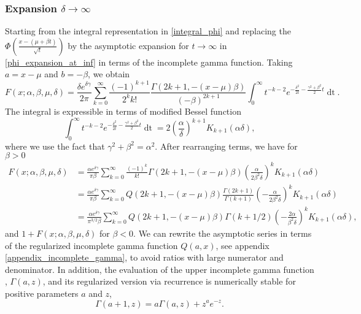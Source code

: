 \documentclass[10pt,a4paper,oneside]{article}
\numberwithin{equation}{section}
\begin{document}
\subsubsection{Expansion $\delta \to \infty$}
Starting from the integral representation in \eqref{integral_phi} and replacing the $\Phi\left(\frac{x-(\mu + \beta t)}{\sqrt{t}}\right)$ by the asymptotic expansion for $t\to \infty$ in \eqref{phi_expansion_at_inf} in terms of the incomplete gamma function. Taking $a = x -\mu$ and $b = -\beta$, we obtain
\begin{equation}
F(x; \alpha, \beta, \mu, \delta) = \frac{\delta e^{\delta \gamma}}{2\pi} \sum_{k=0}^{\infty}\frac{(-1)^{k+1}}{2^k k!} \frac{\Gamma(2k+1, -(x-\mu)\beta)}{(-\beta)^{2k+1}} \int_0^{\infty} t^{-k-2} e^{-\frac{\delta^2}{2t} - \frac{\gamma^2 + \beta^2}{2}t} \mathop{dt}.
\end{equation}
The integral is expressible in terms of modified Bessel function
\begin{equation}
\int_0^{\infty} t^{-k-2} e^{-\frac{\delta^2}{2t} - \frac{\gamma^2 + \beta^2}{2}t} \mathop{dt} = 2 \left(\frac{\alpha}{\delta}\right)^{k + 1} K_{k+1}(\alpha \delta),
\end{equation}
where we use the fact that $\gamma^2+ \beta^2 = \alpha^2$. After rearranging terms, we have for $\beta > 0$
\begin{align}\label{general_asymptotic_delta}
F(x; \alpha, \beta, \mu, \delta) &= \frac{\alpha e^{\delta \gamma}}{\pi \beta}\sum_{k=0}^{\infty} \frac{(-1)^k}{k!} \Gamma(2k + 1, -(x-\mu)\beta)\left(\frac{\alpha}{2\beta^2 \delta}\right)^k K_{k+1}(\alpha \delta)\\
 &=\frac{\alpha e^{\delta \gamma}}{\pi \beta}\sum_{k=0}^{\infty} Q(2k + 1, -(x-\mu)\beta)\frac{\Gamma(2k+1)}{\Gamma(k+1)}\left(-\frac{\alpha}{2\beta^2 \delta}\right)^k K_{k+1}(\alpha \delta)\\
 &=\frac{\alpha e^{\delta \gamma}}{\pi^{3/2} \beta}\sum_{k=0}^{\infty} Q(2k + 1, -(x-\mu)\beta) \Gamma(k + 1/2)\left(-\frac{2\alpha}{\beta^2 \delta}\right)^k K_{k+1}(\alpha \delta),
\end{align}
and $1 + F(x; \alpha, \beta, \mu, \delta)$ for $\beta < 0$. We can rewrite the asymptotic series in terms of the regularized incomplete gamma function $Q(a, x)$, see appendix \ref{appendix_incomplete_gamma}, to avoid ratios with large numerator and denominator. In addition, the evaluation of the upper incomplete gamma function , $\Gamma(a, z)$, and its regularized version via recurrence is numerically stable for positive parameters $a$ and $z$,
\begin{equation}
\Gamma(a + 1, z) = a \Gamma(a, z) + z^a e^{-z}.
\end{equation}
\end{document}

